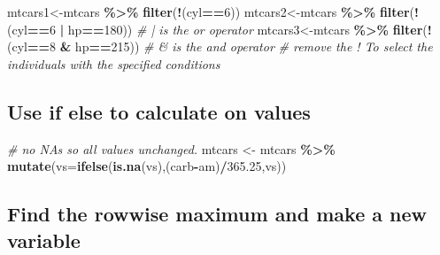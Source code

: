 \documentclass[
]{article}
\newenvironment{Shaded}{\begin{snugshade}}{\end{snugshade}}
\newcommand{\AttributeTok}[1]{\textcolor[rgb]{0.13,0.29,0.53}{#1}}
\newcommand{\CommentTok}[1]{\textcolor[rgb]{0.56,0.35,0.01}{\textit{#1}}}
\newcommand{\DecValTok}[1]{\textcolor[rgb]{0.00,0.00,0.81}{#1}}
\newcommand{\FloatTok}[1]{\textcolor[rgb]{0.00,0.00,0.81}{#1}}
\newcommand{\FunctionTok}[1]{\textcolor[rgb]{0.13,0.29,0.53}{\textbf{#1}}}
\newcommand{\NormalTok}[1]{#1}
\newcommand{\OtherTok}[1]{\textcolor[rgb]{0.56,0.35,0.01}{#1}}
\newcommand{\SpecialCharTok}[1]{\textcolor[rgb]{0.81,0.36,0.00}{\textbf{#1}}}
\begin{document}
\begin{Shaded}
\begin{Highlighting}[]
\NormalTok{mtcars1}\OtherTok{\textless{}{-}}\NormalTok{mtcars }\SpecialCharTok{\%\textgreater{}\%} \FunctionTok{filter}\NormalTok{(}\SpecialCharTok{!}\NormalTok{(cyl}\SpecialCharTok{==}\DecValTok{6}\NormalTok{))}
\NormalTok{mtcars2}\OtherTok{\textless{}{-}}\NormalTok{mtcars }\SpecialCharTok{\%\textgreater{}\%} \FunctionTok{filter}\NormalTok{(}\SpecialCharTok{!}\NormalTok{(cyl}\SpecialCharTok{==}\DecValTok{6} \SpecialCharTok{|}\NormalTok{ hp}\SpecialCharTok{==}\DecValTok{180}\NormalTok{)) }\CommentTok{\# | is the \textquotesingle{}or\textquotesingle{} operator}
\NormalTok{mtcars3}\OtherTok{\textless{}{-}}\NormalTok{mtcars }\SpecialCharTok{\%\textgreater{}\%} \FunctionTok{filter}\NormalTok{(}\SpecialCharTok{!}\NormalTok{(cyl}\SpecialCharTok{==}\DecValTok{8} \SpecialCharTok{\&}\NormalTok{ hp}\SpecialCharTok{==}\DecValTok{215}\NormalTok{)) }\CommentTok{\# \& is the \textquotesingle{}and\textquotesingle{} operator}
\CommentTok{\# remove the ! To select the individuals with the specified conditions}
\end{Highlighting}
\end{Shaded}

\hypertarget{use-if-else-to-calculate-on-values}{%
\subsection{Use if else to calculate on values}\label{use-if-else-to-calculate-on-values}}

\begin{Shaded}
\begin{Highlighting}[]
\CommentTok{\# no NA\textquotesingle{}s so all values unchanged.}
\NormalTok{mtcars }\OtherTok{\textless{}{-}}\NormalTok{ mtcars }\SpecialCharTok{\%\textgreater{}\%} \FunctionTok{mutate}\NormalTok{(}\AttributeTok{vs=}\FunctionTok{ifelse}\NormalTok{(}\FunctionTok{is.na}\NormalTok{(vs),(carb}\SpecialCharTok{{-}}\NormalTok{am)}\SpecialCharTok{/}\FloatTok{365.25}\NormalTok{,vs)) }
\end{Highlighting}
\end{Shaded}

\hypertarget{find-the-rowwise-maximum-and-make-a-new-variable}{%
\subsection{Find the rowwise maximum and make a new variable}\label{find-the-rowwise-maximum-and-make-a-new-variable}}
\end{document}
